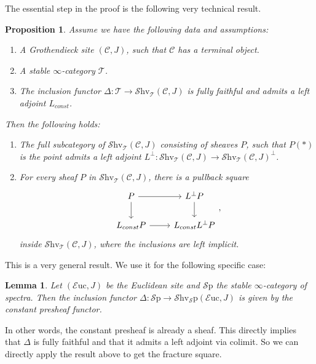 \documentclass[10pt]{amsart}
\newcommand{\C}{\mathscr{C}}
\newcommand{\T}{\mathscr{T}}
\newcommand{\Sp}{\mathscr{S}\mathrm{p}}
\newcommand{\Euc}{\mathscr{E}\mathrm{uc}}
\newcommand{\Shv}{\mathscr{S}\mathrm{hv}}
\newtheorem{lemma}[equation]{Lemma}
\newtheorem{proposition}[equation]{Proposition}
\theoremstyle{definition}
\theoremstyle{remark}
\numberwithin{equation}{section}
\begin{document}
The essential step in the proof is the following very technical result.

\begin{proposition}
  Assume we have the following data and assumptions:
  \begin{enumerate}
    \item A Grothendieck site $(\C,J)$, such that $\C$ has a terminal object.
    \item A stable $\infty$-category $\T$.
    \item The inclusion functor $\Delta\colon \T \to \Shv_\T(\C,J)$ is fully faithful and admits a left adjoint $L_{const}$. 
  \end{enumerate}
  Then the following holds:
  \begin{enumerate}
    \item The full subcategory of $\Shv_\T(\C,J)$ consisting of sheaves $P$, such that $P(*)$ is the point admits a left adjoint $L^{\bot}\colon \Shv_\T(\C,J) \to \Shv_\T(\C,J)^\bot$.
    \item For every sheaf $P$ in $\Shv_\T(\C,J)$, there is a pullback square
    \[
    \begin{tikzcd}
      P \arrow[r] \arrow[d] & L^{\bot}P \arrow[d] \\
      L_{const}P \arrow[r] & L_{const}L^{\bot}P
    \end{tikzcd},
    \]
    inside $\Shv_\T(\C,J)$, where the inclusions are left implicit.
  \end{enumerate} 
\end{proposition}

This is a very general result. We use it for the following specific case:
\begin{lemma}
 Let $(\Euc,J)$ be the Euclidean site and $\Sp$ the stable $\infty$-category of spectra. Then the inclusion functor $\Delta\colon \Sp \to \Shv_\Sp(\Euc,J)$ is given by the constant presheaf functor.
\end{lemma}

In other words, the constant presheaf is already a sheaf. This directly implies that $\Delta$ is fully faithful and that it admits a left adjoint via colimit. So we can directly apply the result above to get the fracture square.
\end{document}
